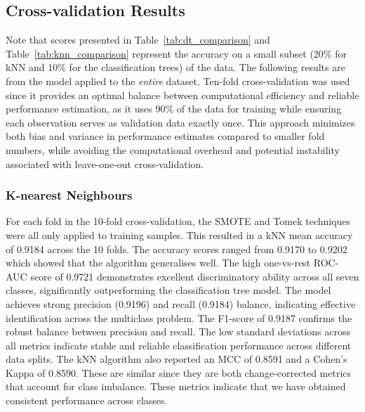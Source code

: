 \documentclass[10pt, conference]{IEEEtran}
\begin{document}
\subsection{Cross-validation Results}
Note that scores presented in Table~\ref{tab:dt_comparison} and Table~\ref{tab:knn_comparison} represent the accuracy on a small subset (20\% for kNN and 10\% for the classification trees) of the data. The following results are from the model applied to the \textit{entire} dataset. Ten-fold cross-validation was used since it provides an optimal balance between computational efficiency and reliable performance estimation, as it uses 90\% of the data for training while ensuring each observation serves as validation data exactly once. This approach minimizes both bias and variance in performance estimates compared to smaller fold numbers, while avoiding the computational overhead and potential instability associated with leave-one-out cross-validation.

\subsubsection{K-nearest Neighbours}

For each fold in the 10-fold cross-validation, the SMOTE and Tomek techniques were all only applied to training samples. This resulted in a kNN mean accuracy of 0.9184 across the 10 folds. The accuracy scores ranged from 0.9170 to 0.9202 which showed that the algorithm generalises well. The high one-vs-rest ROC-AUC score of 0.9721 demonstrates excellent discriminatory ability across all seven classes, significantly outperforming the classification tree model. The model achieves strong precision (0.9196) and recall (0.9184) balance, indicating effective identification across the multiclass problem. The F1-score of 0.9187 confirms the robust balance between precision and recall. The low standard deviations across all metrics indicate stable and reliable classification performance across different data splits. The kNN algorithm also reported an MCC of 0.8591 and a Cohen's  Kappa of 0.8590. These are similar since they are both change-corrected metrics that account for class imbalance. These metrics indicate that we have obtained consistent performance across classes.
\end{document}

